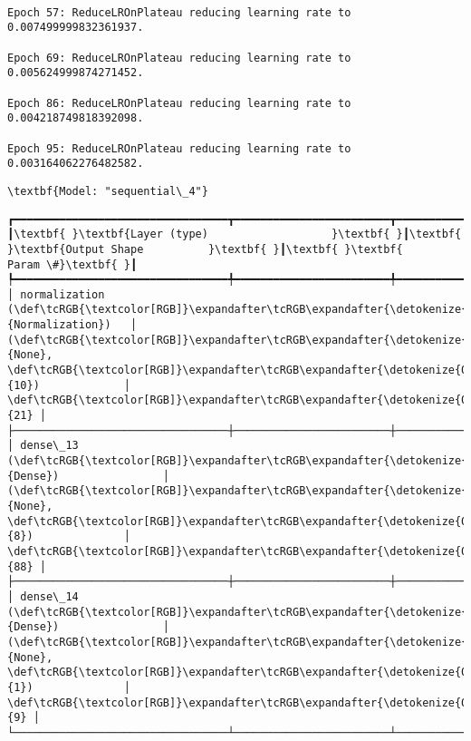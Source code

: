 \documentclass[11pt]{article}
\begin{document}
    \begin{Verbatim}[commandchars=\\\{\}]

Epoch 57: ReduceLROnPlateau reducing learning rate to 0.007499999832361937.

Epoch 69: ReduceLROnPlateau reducing learning rate to 0.005624999874271452.

Epoch 86: ReduceLROnPlateau reducing learning rate to 0.004218749818392098.

Epoch 95: ReduceLROnPlateau reducing learning rate to 0.003164062276482582.
    \end{Verbatim}

    
    \begin{Verbatim}[commandchars=\\\{\}]
\textbf{Model: "sequential\_4"}

    \end{Verbatim}

    
    
    \begin{Verbatim}[commandchars=\\\{\}]
┏━━━━━━━━━━━━━━━━━━━━━━━━━━━━━━━━━┳━━━━━━━━━━━━━━━━━━━━━━━━┳━━━━━━━━━━━━━━━┓
┃\textbf{ }\textbf{Layer (type)                   }\textbf{ }┃\textbf{ }\textbf{Output Shape          }\textbf{ }┃\textbf{ }\textbf{      Param \#}\textbf{ }┃
┡━━━━━━━━━━━━━━━━━━━━━━━━━━━━━━━━━╇━━━━━━━━━━━━━━━━━━━━━━━━╇━━━━━━━━━━━━━━━┩
│ normalization (\def\tcRGB{\textcolor[RGB]}\expandafter\tcRGB\expandafter{\detokenize{0,135,255}}{Normalization})   │ (\def\tcRGB{\textcolor[RGB]}\expandafter\tcRGB\expandafter{\detokenize{0,215,255}}{None}, \def\tcRGB{\textcolor[RGB]}\expandafter\tcRGB\expandafter{\detokenize{0,175,0}}{10})             │            \def\tcRGB{\textcolor[RGB]}\expandafter\tcRGB\expandafter{\detokenize{0,175,0}}{21} │
├─────────────────────────────────┼────────────────────────┼───────────────┤
│ dense\_13 (\def\tcRGB{\textcolor[RGB]}\expandafter\tcRGB\expandafter{\detokenize{0,135,255}}{Dense})                │ (\def\tcRGB{\textcolor[RGB]}\expandafter\tcRGB\expandafter{\detokenize{0,215,255}}{None}, \def\tcRGB{\textcolor[RGB]}\expandafter\tcRGB\expandafter{\detokenize{0,175,0}}{8})              │            \def\tcRGB{\textcolor[RGB]}\expandafter\tcRGB\expandafter{\detokenize{0,175,0}}{88} │
├─────────────────────────────────┼────────────────────────┼───────────────┤
│ dense\_14 (\def\tcRGB{\textcolor[RGB]}\expandafter\tcRGB\expandafter{\detokenize{0,135,255}}{Dense})                │ (\def\tcRGB{\textcolor[RGB]}\expandafter\tcRGB\expandafter{\detokenize{0,215,255}}{None}, \def\tcRGB{\textcolor[RGB]}\expandafter\tcRGB\expandafter{\detokenize{0,175,0}}{1})              │             \def\tcRGB{\textcolor[RGB]}\expandafter\tcRGB\expandafter{\detokenize{0,175,0}}{9} │
└─────────────────────────────────┴────────────────────────┴───────────────┘

    \end{Verbatim}
\end{document}
